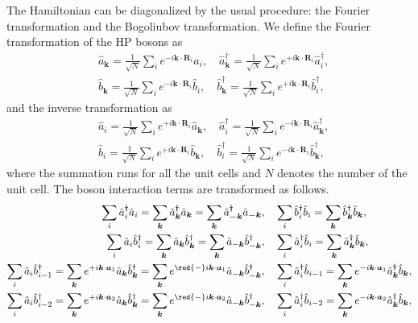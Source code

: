 \documentclass[11pt, aps, longbibliography]{article}
\begin{document}
The Hamiltonian can be diagonalized by the usual procedure: the Fourier transformation and the Bogoliubov transformation.
We define the Fourier transformation of the HP bosons as
\begin{align} 
    &\hat{a}_{\bm{k}} = \frac{1}{\sqrt{N}}\sum_{i}e^{-i\bm{k}\cdot\bm{R}_i}\hat{a}_i, \quad  \hat{a}^\dagger_{\bm{k}} = \frac{1}{\sqrt{N}}\sum_{i}e^{+i\bm{k}\cdot\bm{R}_i}\hat{a}^\dagger_i, \label{eq:FT-HPboson-a} \\
    &\hat{b}_{\bm{k}} = \frac{1}{\sqrt{N}}\sum_{i}e^{-i\bm{k}\cdot\bm{R}_i}\hat{b}_i, \quad  \hat{b}^\dagger_{\bm{k}} = \frac{1}{\sqrt{N}}\sum_{i}e^{+i\bm{k}\cdot\bm{R}_i}\hat{b}^\dagger_i, \label{eq:FT-HPboson-b}
\end{align}
and the inverse transformation as
\begin{align}
    &\hat{a}_i = \frac{1}{\sqrt{N}}\sum_{i}e^{+i\bm{k}\cdot\bm{R}_i}\hat{a}_{\bm{k}}, \quad  \hat{a}^\dagger_i = \frac{1}{\sqrt{N}}\sum_{i}e^{-i\bm{k}\cdot\bm{R}_i}\hat{a}^\dagger_{\bm{k}}, \\
    &\hat{b}_i = \frac{1}{\sqrt{N}}\sum_{i}e^{+i\bm{k}\cdot\bm{R}_i}\hat{b}_{\bm{k}}, \quad  \hat{b}^\dagger_i = \frac{1}{\sqrt{N}}\sum_{i}e^{-i\bm{k}\cdot\bm{R}_i}\hat{b}^\dagger_{\bm{k}},
\end{align}
where the summation runs for all the unit cells and $N$ denotes the number of the unit cell.
The boson interaction terms are transformed as follows.
\begin{align}
    \sum_{i}\hat{a}^\dagger_i \hat{a}_i = \sum_{\bm{k}}\hat{a}^\dagger_{\bm{k}} \hat{a}_{\bm{k}} = \sum_{\bm{k}}\hat{a}^\dagger_{\bm{-k}} \hat{a}_{\bm{-k}}, & \quad \sum_{i}\hat{b}^\dagger_i \hat{b}_i = \sum_{\bm{k}}\hat{b}^\dagger_{\bm{k}} \hat{b}_{\bm{k}}, \\
    \sum_{i}\hat{a}_i \hat{b}_i^\dagger = \sum_{\bm{k}}\hat{a}_{\bm{k}} \hat{b}_{\bm{k}}^\dagger =\sum_{\bm{k}}\hat{a}_{-\bm{k}} \hat{b}_{-\bm{k}}^\dagger, & \quad \sum_{i}\hat{a}^\dagger_i \hat{b}_i = \sum_{\bm{k}}\hat{a}^\dagger_{\bm{k}} \hat{b}_{\bm{k}}, \\
    \sum_{i}\hat{a}_i \hat{b}_{i-1}^\dagger = \sum_{\bm{k}} e^{+i\bm{k}\cdot \bm{a}_1}\hat{a}_{\bm{k}} \hat{b}_{\bm{k}}^\dagger = \sum_{\bm{k}} e^{\red{-}i\bm{k}\cdot \bm{a}_1}\hat{a}_{-\bm{k}} \hat{b}_{-\bm{k}}^\dagger , & \quad \sum_{i}\hat{a}^\dagger_{i} \hat{b}_{i-1} = \sum_{\bm{k}}e^{-i\bm{k}\cdot \bm{a}_1} \hat{a}^\dagger_{\bm{k}} \hat{b}_{\bm{k}}, \\
    \sum_{i}\hat{a}_i \hat{b}_{i-2}^\dagger = \sum_{\bm{k}} e^{+i\bm{k}\cdot \bm{a}_2}\hat{a}_{\bm{k}} \hat{b}_{\bm{k}}^\dagger = \sum_{\bm{k}} e^{\red{-}i\bm{k}\cdot \bm{a}_2}\hat{a}_{-\bm{k}} \hat{b}_{-\bm{k}}^\dagger, & \quad \sum_{i}\hat{a}^\dagger_{i} \hat{b}_{i-2} = \sum_{\bm{k}}e^{-i\bm{k}\cdot \bm{a}_2} \hat{a}^\dagger_{\bm{k}} \hat{b}_{\bm{k}}, 
\end{align}
\end{document}
